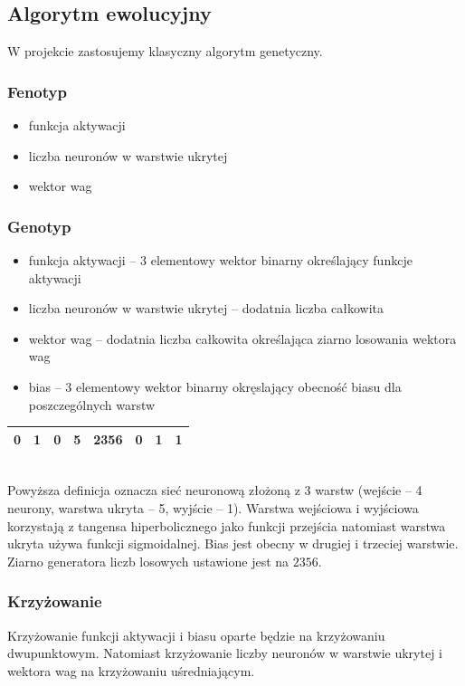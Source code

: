\documentclass{llncs}
\begin{document}
\subsection{Algorytm ewolucyjny}
W projekcie zastosujemy klasyczny algorytm genetyczny.
\subsubsection{Fenotyp}
\begin{itemize}
	\item funkcja aktywacji
	\item liczba neuronów w warstwie ukrytej
	\item wektor wag
\end{itemize}

\subsubsection{Genotyp}
\begin{itemize}
	\item funkcja aktywacji -- 3 elementowy wektor binarny określający funkcje aktywacji
	\item liczba neuronów w warstwie ukrytej -- dodatnia liczba całkowita
	\item wektor wag -- dodatnia liczba całkowita określająca ziarno losowania wektora wag
	\item bias -- 3 elementowy wektor binarny okręslający obecność biasu dla poszczególnych warstw
\end{itemize}

\begin{example}

\begin{tabular}{ | c | c | c | c | c | c | c | c | }
	\hline
	0 & 1 & 0 & 5 & 2356 & 0 & 1 & 1\\
	\hline
\end{tabular}
\\
Powyższa definicja oznacza sieć neuronową złożoną z 3 warstw 
(wejście -- 4 neurony, warstwa ukryta -- 5, wyjście -- 1).
Warstwa wejściowa i wyjściowa korzystają z tangensa hiperbolicznego jako funkcji przejścia natomiast 
warstwa ukryta używa funkcji sigmoidalnej. Bias jest obecny w drugiej i trzeciej warstwie. Ziarno
generatora liczb losowych ustawione jest na $2356$.
\end{example}

\subsubsection{Krzyżowanie}
Krzyżowanie funkcji aktywacji i biasu oparte będzie na krzyżowaniu dwupunktowym. Natomiast
krzyżowanie liczby neuronów w warstwie ukrytej i wektora wag na krzyżowaniu uśredniającym.
\end{document}
